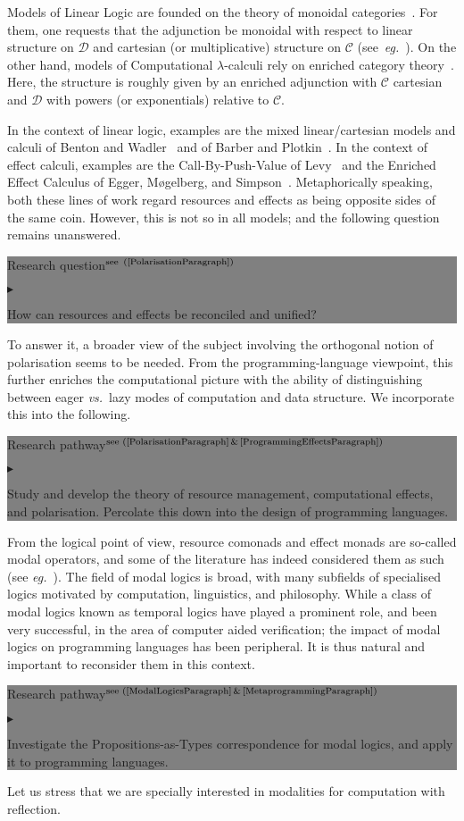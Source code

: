 \documentclass[11pt,twocolumn]{article}
\newenvironment{btritemize}
  {\begin{list}{\btr}
  {\setlength{\topsep}{2pt}
   \setlength{\partopsep}{2pt}
   \setlength{\itemsep}{2.5pt}
   \setlength{\parsep}{2.5pt}
   \setlength{\leftmargin}{1em}
   \setlength{\labelwidth}{.5em}}}
  {\end{list}}
\newcommand{\mytextsf}[1]{\textsf{\small #1}}
\newcommand{\pref}[1]{\,(\ref{#1})}
\newcommand{\eg}{\emph{eg.}}
\newcommand{\vs}{\emph{vs.}}
\newcommand{\btr}{$\blacktriangleright$}
\newcommand{\reqpsize}{8.113395cm}%
\newcommand{\req}[2]{\begin{center}\colorbox{grey}{\begin{minipage}{\reqpsize} 
  \mytextsf{Research question}\hfill$^{\mbox{\scriptsize see #1 }}$\\[-5.5mm]
  \begin{btritemize}
  \item #2
  \end{btritemize}
\end{minipage}}\end{center}}
\newcommand{\rep}[2]{\begin{center}\colorbox{grey}{\begin{minipage}{\reqpsize}
  \mytextsf{Research pathway}\hfill$^{\mbox{\scriptsize see #1 }}$\\[-5.5mm]
  \begin{btritemize}
  \item #2
  \end{btritemize}
\end{minipage}}\end{center}}
\newcommand{\cat}[1]{\mathscr{#1}}
\begin{document}
Models of Linear Logic are founded on the theory of
monoidal categories~\cite[Chapter~VII.1]{MacLane}.  For them, one requests
that the adjunction be monoidal with respect to linear structure on $\cat D$
and cartesian (or multiplicative) structure on $\cat C$
(see~\eg~\cite{MelliesCMLL}).  On the other hand, models of Computational
\mbox{$\lambda$-calculi} rely on enriched category theory~\cite{KellyBook}.
Here, the structure is roughly given by an enriched adjunction with $\cat C$
cartesian and $\cat D$ with powers (or exponentials) relative to $\cat C$.

In the context of linear logic, examples are the mixed linear/cartesian models
and calculi of Benton and Wadler~\cite{BentonWadler} and of Barber and
Plotkin~\cite{BarberPlotkin}.  In the context of effect calculi, examples are
the Call-By-Push-Value of Levy~\cite{LevyCBPV} and the Enriched Effect
Calculus of Egger, M{\o}gelberg, and Simpson~\cite{EEC}.  Metaphorically
speaking, both these lines of work regard resources and effects as being
opposite sides of the same coin.  However, this is not so in all models;
and the following question remains unanswered.
%
\req{\pref{PolarisationParagraph}}
  {How can resources and effects be reconciled and unified?}
%
To answer it, a broader view of the subject involving the orthogonal
notion of polarisation seems to be needed.  From the programming-language
viewpoint, this further enriches the computational picture with the
ability of distinguishing between eager \vs~lazy modes of computation and
data structure.  We incorporate this into the following.
%
\rep{(\ref{PolarisationParagraph}\,\&\,\ref{ProgrammingEffectsParagraph})}
  {Study and develop the theory of resource management, computational
    effects, and polarisation.  Percolate this down into the design of
    programming languages.}

From the logical point of view, resource comonads and effect monads are
so-called modal operators, and some of the literature has indeed
considered them as such (see \eg~\cite{Kobayashi}).  %
The field of modal logics is broad, with many subfields of specialised
logics motivated by computation, linguistics, and philosophy.  While a
class of modal logics known as temporal logics have played a prominent
role, and been very successful, in the area of computer aided verification;
the impact of modal logics on programming languages has been peripheral.
It is thus natural and important to reconsider them in this context. 
%
\rep{(\ref{ModalLogicsParagraph}\,\&\,\ref{MetaprogrammingParagraph})}
  {Investigate the Propositions-as-Types correspondence for modal logics,
    and apply it to programming languages.}
Let us stress that we are specially interested in modalities for
computation with reflection.
\end{document}
